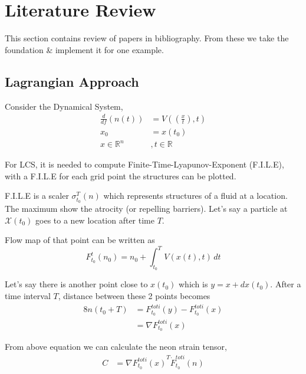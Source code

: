 \documentclass[../report.tex]{subfiles}
\begin{document}
\chapter{Literature Review}

This section contains review of papers in bibliography. From these we take the foundation \& implement it for one example.

\section{Lagrangian Approach}
Consider the Dynamical System,
\begin{equation}
  \begin{aligned}
    \frac{d}{df}(n(t)) &= V((\frac{x}{t}), t) \\
    x_0 &= x(t_0) \\
    x \in \mathbb{R}^n &, t \in \mathbb{R}
  \end{aligned}
\end{equation}

For LCS, it is needed to compute Finite-Time-Lyapunov-Exponent (F.I.L.E), with a F.I.L.E for each grid point the structures can be plotted. \par

F.I.L.E is a scaler \(\sigma_{t_0}^T(n)\) which represents structures of a fluid at a location. The maximum show the atrocity (or repelling barriers). Let's say a particle at \(\mathcal{X}(t_0)\) goes to a new location after time \(T\). \par

Flow map of that point can be written as
\begin{equation}
  F_{t_0}^t(n_0) = n_0 + \int_{t_0}^{T} V(x(t), t)\,dt
\end{equation}

Let's say there is another point close to \(x(t_0)\) which is \(y = x + dx(t_0)\). After a time interval \(T\), distance between these 2 points becomes
\begin{equation}
  \begin{aligned}
    8n(t_0 + T) &= F_{t_0}^{toti} (y) - F_{t_0}^{toti} (x) \\
    &= \nabla F_{t_0}^{toti}(x)
  \end{aligned}
\end{equation}

From above equation we can calculate the neon strain tensor,
\begin{equation}
  \begin{aligned}
    C &= \nabla {F_{t_0}^{toti}(x)}^T \dot F_{t_0}^{toti}(n)
  \end{aligned}
\end{equation}
\end{document}
